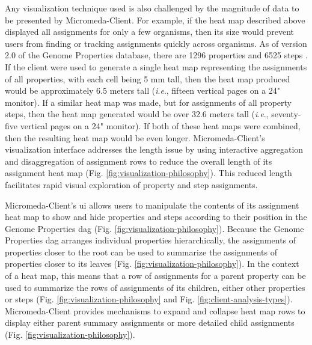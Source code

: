 Any visualization technique used is also challenged by the magnitude of data to 
be presented by Micromeda-Client. For example, if the heat map described above 
displayed all assignments for only a few organisms, then its size would prevent 
users from finding or tracking assignments quickly across organisms. As of 
version 2.0 of the Genome Properties database, there are 1296 properties and 
6525 steps \cite{richardson2018genome}. If the client were used to generate a 
single heat map representing the assignments of all properties, with each cell 
being 5 mm tall, then the heat map produced would be approximately 6.5 meters 
tall (\textit{i}.\textit{e}., fifteen vertical pages on a 24" monitor). If a similar heat map was 
made, but for assignments of all property steps, then the heat map generated 
would be over 32.6 meters tall (\textit{i}.\textit{e}., seventy-five vertical pages on a 24" 
monitor). If both of these heat maps were combined, then the resulting heat map 
would be even longer. Micromeda-Client's visualization interface addresses the 
length issue by using interactive aggregation and disaggregation 
\cite{munzner2015visualization} of assignment rows to reduce the overall length 
of its assignment heat map (Fig. \ref{fig:visualization-philosophy}). This 
reduced length facilitates rapid visual exploration of property and step 
assignments.

Micromeda-Client's \gls{ui} allows users to manipulate the contents of its 
assignment heat map to show and hide properties and steps according to their 
position in the Genome Properties \gls{dag} \cite{richardson2018genome} (Fig. 
\ref{fig:visualization-philosophy}). Because the Genome Properties \gls{dag} 
arranges individual properties hierarchically, the assignments of properties 
closer to the root can be used to summarize the assignments of properties closer 
to its leaves (Fig. \ref{fig:visualization-philosophy}). In the context of a 
heat map, this means that a row of assignments for a parent property can be used 
to summarize the rows of assignments of its children, either other properties or 
steps (Fig. \ref{fig:visualization-philosophy} and Fig. 
\ref{fig:client-analysis-types}). Micromeda-Client provides mechanisms to expand 
and collapse heat map rows to display either parent summary assignments or more 
detailed child assignments (Fig. \ref{fig:visualization-philosophy}).

